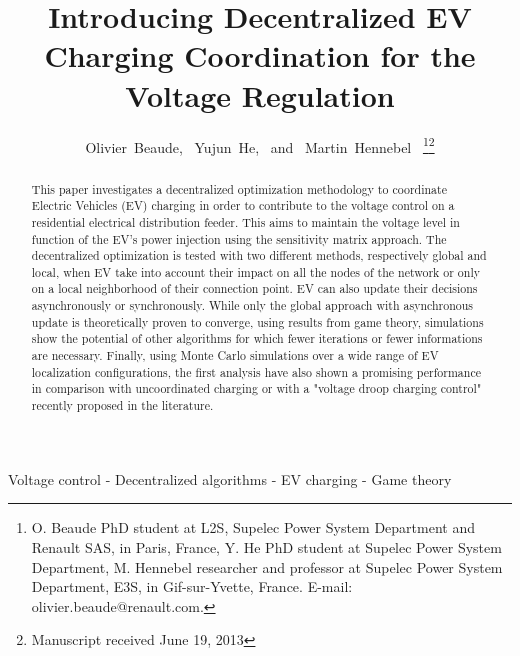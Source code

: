 \documentclass[journal]{IEEEtran}
\begin{document}
\title{Introducing Decentralized EV Charging Coordination for the Voltage Regulation}

\author{Olivier~Beaude,~
				Yujun~He,~
        and ~Martin~Hennebel~
\thanks{O. Beaude PhD student at L2S, Supelec Power System Department and Renault SAS, in Paris, France, Y. He PhD student at Supelec Power System Department, M. Hennebel researcher and professor at Supelec Power System Department, E3S, in Gif-sur-Yvette, France. E-mail: olivier.beaude@renault.com.}\thanks{Manuscript received June 19, 2013
}}


\maketitle


\begin{abstract}
This paper investigates a decentralized optimization methodology to coordinate Electric Vehicles (EV) charging in order to contribute to the voltage control on a residential electrical distribution feeder. This aims to maintain the voltage level in function of the EV's power injection using the sensitivity matrix approach. The decentralized optimization is tested with two different methods, respectively global and local, when EV take into account their impact on all the nodes of the network or only on a local neighborhood of their connection point. EV can also update their decisions asynchronously or synchronously. While only the global approach with asynchronous update is theoretically proven to converge, using results from game theory, simulations show the potential of other algorithms for which fewer iterations or fewer informations are necessary. Finally, using Monte Carlo simulations over a wide range of EV localization configurations, the first analysis have also shown a promising performance in comparison with uncoordinated charging or with a "voltage droop charging control" recently proposed in the literature.
\end{abstract}

\begin{IEEEkeywords}Voltage control - Decentralized algorithms - EV charging - Game theory
\end{IEEEkeywords}

\IEEEpeerreviewmaketitle
\end{document}
